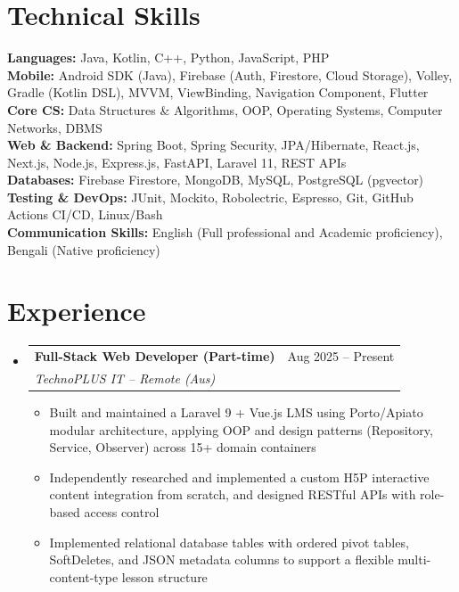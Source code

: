 \documentclass[letterpaper,10.5pt]{article}
\makeatletter
\newcommand{\resumeItem}[1]{%
  \item\small{#1}\par\vspace{-2pt}%
}
\newcommand{\resumeSubheading}[4]{
  \vspace{-2pt}\item
    \begin{tabular*}{\textwidth}[t]{l@{\extracolsep{\fill}}r}
      \textbf{#1} & #2 \\
      \textit{\small#3} & \textit{\small #4} \\
    \end{tabular*}\vspace{-7pt}
}
\newcommand{\resumeSubHeadingListStart}{\begin{itemize}[leftmargin=0.0in, label={}]}
\newcommand{\resumeSubHeadingListEnd}{\end{itemize}}
\newcommand{\resumeItemListStart}{\begin{itemize}[leftmargin=0.15in]}
\newcommand{\resumeItemListEnd}{\end{itemize}\vspace{-5pt}}
\makeatother
\begin{document}
\section{Technical Skills}
 \begin{itemize}[leftmargin=0.0in, label={}]
    \small{\item{
     \textbf{Languages:} Java, Kotlin, C++, Python, JavaScript, PHP \\[1pt]
     \textbf{Mobile:} Android SDK (Java), Firebase (Auth, Firestore, Cloud Storage), Volley, Gradle (Kotlin DSL), MVVM, ViewBinding, Navigation Component, Flutter \\[1pt]
     \textbf{Core CS:} Data Structures \& Algorithms, OOP, Operating Systems, Computer Networks, DBMS \\[1pt]
     \textbf{Web \& Backend:} Spring Boot, Spring Security, JPA/Hibernate, React.js, Next.js, Node.js, Express.js, FastAPI, Laravel 11, REST APIs \\[1pt]
     \textbf{Databases:} Firebase Firestore, MongoDB, MySQL, PostgreSQL (pgvector) \\[1pt]
     \textbf{Testing \& DevOps:} JUnit, Mockito, Robolectric, Espresso, Git, GitHub Actions CI/CD, Linux/Bash \\[1pt]
     \textbf{Communication Skills:} English (Full professional and Academic proficiency), Bengali (Native proficiency)
    }}
 \end{itemize}
\vspace{-8pt}

\section{Experience}
  \resumeSubHeadingListStart
    \resumeSubheading
      {Full-Stack Web Developer (Part-time)}{Aug 2025 -- Present}
      {TechnoPLUS IT -- Remote (Aus)}{}
      \resumeItemListStart
        \resumeItem{Built and maintained a Laravel 9 + Vue.js LMS using Porto/Apiato modular architecture, applying OOP and design patterns (Repository, Service, Observer) across 15+ domain containers}
        \resumeItem{Independently researched and implemented a custom H5P interactive content integration from scratch, and designed RESTful APIs with role-based access control}
        \resumeItem{Implemented relational database tables with ordered pivot tables, SoftDeletes, and JSON metadata columns to support a flexible multi-content-type lesson structure}
      \resumeItemListEnd
  \resumeSubHeadingListEnd
\vspace{-8pt}
\end{document}
